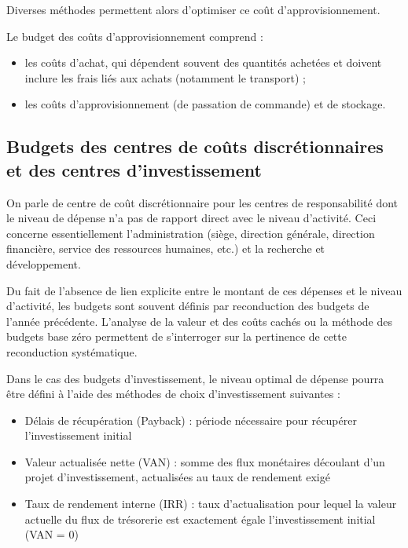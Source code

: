 \documentclass[oneside]{kaobook}
\begin{document}
Diverses méthodes permettent alors d'optimiser ce coût d'approvisionnement.

Le budget des coûts d'approvisionnement comprend :
\begin{itemize}
\item les coûts d'achat, qui dépendent souvent des quantités achetées et doivent inclure les frais liés aux achats (notamment le transport) ;
\item les coûts d'approvisionnement (de passation de commande) et de stockage.
\end{itemize}

\subsection{Budgets des centres de coûts discrétionnaires et des centres d'investissement}
\label{sec:orgbcf0fe9}

On parle de centre de coût discrétionnaire pour les centres de responsabilité dont le niveau de dépense n'a pas de rapport direct avec le niveau d'activité. Ceci concerne essentiellement l'administration (siège, direction générale, direction financière, service des ressources humaines, etc.) et la recherche et développement.

Du fait de l'absence de lien explicite entre le montant de ces dépenses et le niveau d'activité, les budgets sont souvent définis par reconduction des budgets de l'année précédente. L'analyse de la valeur et des coûts cachés ou la méthode des budgets base zéro permettent de s'interroger sur la pertinence de cette reconduction systématique.

Dans le cas des budgets d'investissement, le niveau optimal de dépense pourra être défini à l'aide des méthodes de choix d'investissement suivantes :
\begin{itemize}
\item Délais de récupération (Payback) : période nécessaire pour récupérer l'investissement initial
\item Valeur actualisée nette (VAN) : somme des flux monétaires découlant d’un projet d’investissement, actualisées au taux de rendement exigé
\item Taux de rendement interne (IRR) : taux d’actualisation  pour lequel la valeur actuelle du flux de trésorerie est exactement égale l'investissement initial  (VAN  = 0)
\end{itemize}
\end{document}
